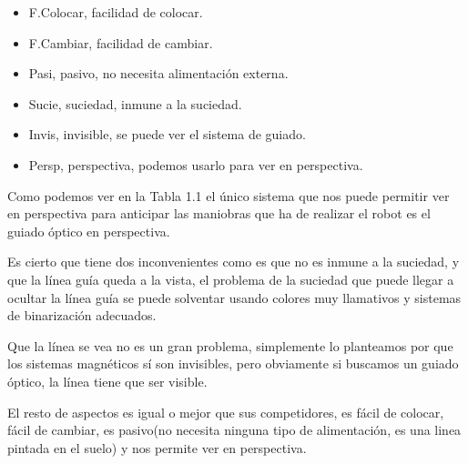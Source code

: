 \begin{itemize}
	\item F.Colocar, facilidad de colocar.
	\item F.Cambiar, facilidad de cambiar.
	\item Pasi, pasivo, no necesita alimentación externa.
	\item Sucie, suciedad, inmune a la suciedad.
	\item Invis, invisible, se puede ver el sistema de guiado.
	\item Persp, perspectiva, podemos usarlo para ver en perspectiva.
\end{itemize}

Como podemos ver en la Tabla 1.1 el único sistema que nos puede permitir ver en perspectiva para anticipar las maniobras que ha de realizar el robot es el guiado óptico en perspectiva. 

Es cierto que tiene dos inconvenientes como es que no es inmune a la suciedad, y que la línea guía queda a la vista, el problema de la suciedad que puede llegar a ocultar la línea guía se puede solventar usando colores muy llamativos y sistemas de binarización adecuados.

Que la línea se vea  no es un gran problema, simplemente lo planteamos por que los sistemas magnéticos sí son invisibles, pero obviamente si buscamos un guiado óptico, la línea tiene que ser visible.

El resto de aspectos es igual o mejor que sus competidores, es fácil de colocar, fácil de cambiar, es pasivo(no necesita ninguna tipo de alimentación, es una linea pintada en el suelo) y nos permite ver en perspectiva.